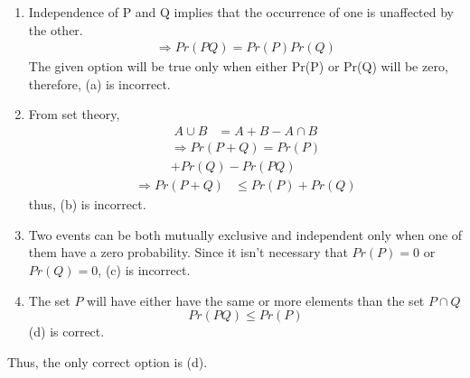 \documentclass[journal,12pt,twocolumn]{IEEEtran}
\begin{document}
\begin{enumerate}[label = (\alph*)]
    \item Independence of P and Q implies that the occurrence of one is unaffected by the other. 
    \begin{align}
       \Rightarrow Pr(PQ) = Pr(P)Pr(Q)
    \end{align}
    The given option will be true only when either Pr(P) or Pr(Q) will be zero, therefore, (a) is incorrect.\\
    \item From set theory,
    \begin{align}
    A\cup B &= A + B - A\cap B
    \end{align}
    \begin{multline}
    \Rightarrow Pr(P+Q) = Pr(P) \\+ Pr(Q)- Pr(PQ)
    \label{eq:5}
    \end{multline}
    \begin{align}
    \Rightarrow Pr(P+Q) &\leq Pr(P) + Pr(Q)
    \end{align}
    thus, (b) is incorrect.\\
    \item Two events can be both mutually exclusive and independent only when one of them have a zero probability. Since it isn't necessary that $Pr(P)=0$ or $Pr(Q)=0$, (c) is incorrect.\\
    \item The set $P$ will have either have the same or more elements than the set $P\cap Q$
    \begin{equation}
        Pr(PQ) \leq Pr(P)
    \end{equation}
    (d) is correct.\\
\end{enumerate}
Thus, the only correct option is (d).
\end{document}
